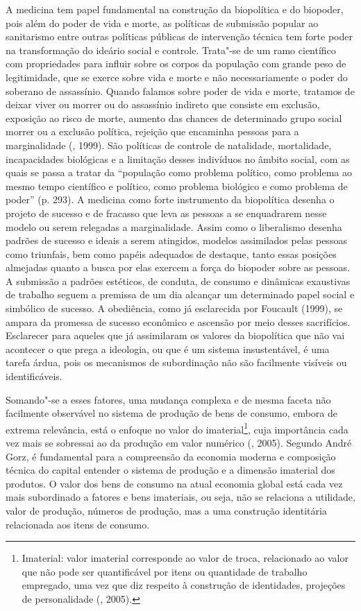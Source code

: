 A medicina tem papel fundamental na construção da biopolítica e do
biopoder, pois além do poder de vida e morte, as políticas de submissão
popular ao sanitarismo entre outras políticas públicas de intervenção
técnica tem forte poder na transformação do ideário social e controle.
Trata"-se de um ramo científico com propriedades para influir sobre os
corpos da população com grande peso de legitimidade, que se exerce sobre
vida e morte e não necessariamente o poder do soberano de assassínio.
Quando falamos sobre poder de vida e morte, tratamos de deixar viver ou
morrer ou do assassínio indireto que consiste em exclusão, exposição ao
risco de morte, aumento das chances de determinado grupo social morrer
ou a exclusão política, rejeição que encaminha pessoas para a
marginalidade (, 1999). São políticas de controle de natalidade,
mortalidade, incapacidades biológicas e a limitação desses indivíduos no
âmbito social, com as quais se passa a tratar da ``população como
problema político, como problema ao mesmo tempo científico e político,
como problema biológico e como problema de poder'' (p. 293). A medicina como
forte instrumento da biopolítica desenha o projeto de sucesso e de
fracasso que leva as pessoas a se enquadrarem nesse modelo ou serem
relegadas a marginalidade. Assim como o liberalismo desenha padrões de
sucesso e ideais a serem atingidos, modelos assimilados pelas pessoas
como triunfais, bem como papéis adequados de destaque, tanto essas
posições almejadas quanto a busca por elas exercem a força do biopoder
sobre as pessoas. A submissão a padrões estéticos, de conduta, de
consumo e dinâmicas exaustivas de trabalho seguem a premissa de um dia
alcançar um determinado papel social e simbólico de sucesso. A
obediência, como já esclarecida por Foucault (1999), se ampara da promessa
de sucesso econômico e ascensão por meio desses sacrifícios. Esclarecer
para aqueles que já assimilaram os valores da biopolítica que não vai
acontecer o que prega a ideologia, ou que é um sistema insustentável, é
uma tarefa árdua, pois os mecanismos de subordinação não são facilmente
visíveis ou identificáveis.

Somando"-se a esses fatores, uma mudança complexa e de mesma faceta não
facilmente observável no sistema de produção de bens de consumo, embora
de extrema relevância, está o enfoque no valor do imaterial\footnote{Imaterial:
  valor imaterial corresponde ao valor de troca, relacionado ao valor
  que não pode ser quantificável por itens ou quantidade de trabalho
  empregado, uma vez que diz respeito à construção de identidades,
  projeções de personalidade (, 2005).}, cuja importância cada vez
mais se sobressai ao da produção em valor numérico (, 2005). Segundo
André Gorz, é fundamental para a compreensão da economia moderna e
composição técnica do capital entender o sistema de produção e a
dimensão imaterial dos produtos. O valor dos bens de consumo na atual
economia global está cada vez mais subordinado a fatores e bens
imateriais, ou seja, não se relaciona a utilidade, valor de produção,
números de produção, mas a uma construção identitária relacionada aos
itens de consumo.

